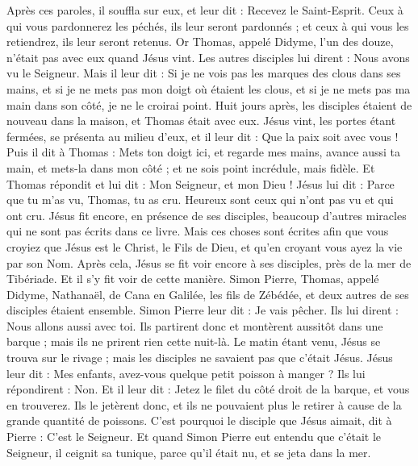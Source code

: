\begin{multicols}{2}
Après ces paroles, il souffla sur eux, et leur dit : Recevez le Saint-Esprit.
Ceux à qui vous pardonnerez les péchés, ils leur seront pardonnés ; et ceux à qui vous les retiendrez, ils leur seront retenus.
Or Thomas, appelé Didyme, l'un des douze, n'était pas avec eux quand Jésus vint.
Les autres disciples lui dirent : Nous avons vu le Seigneur. Mais il leur dit : Si je ne vois pas les marques des clous dans ses mains, et si je ne mets pas mon doigt où étaient les clous, et si je ne mets pas ma main dans son côté, je ne le croirai point.
Huit jours après, les disciples étaient de nouveau dans la maison, et Thomas était avec eux. Jésus vint, les portes étant fermées, se présenta au milieu d'eux, et il leur dit : Que la paix soit avec vous !
Puis il dit à Thomas : Mets ton doigt ici, et regarde mes mains, avance aussi ta main, et mets-la dans mon côté ; et ne sois point incrédule, mais fidèle.
Et Thomas répondit et lui dit : Mon Seigneur, et mon Dieu !
Jésus lui dit : Parce que tu m'as vu, Thomas, tu as cru. Heureux sont ceux qui n'ont pas vu et qui ont cru.
Jésus fit encore, en présence de ses disciples, beaucoup d'autres miracles qui ne sont pas écrits dans ce livre.
Mais ces choses sont écrites afin que vous croyiez que Jésus est le Christ, le Fils de Dieu, et qu'en croyant vous ayez la vie par son Nom.
\VerseOne{}Après cela, Jésus se fit voir encore à ses disciples, près de la mer de Tibériade. Et il s'y fit voir de cette manière.
Simon Pierre, Thomas, appelé Didyme, Nathanaël, de Cana en Galilée, les fils de Zébédée, et deux autres de ses disciples étaient ensemble.
Simon Pierre leur dit : Je vais pêcher. Ils lui dirent : Nous allons aussi avec toi. Ils partirent donc et montèrent aussitôt dans une barque ; mais ils ne prirent rien cette nuit-là.
Le matin étant venu, Jésus se trouva sur le rivage ; mais les disciples ne savaient pas que c'était Jésus.
Jésus leur dit : Mes enfants, avez-vous quelque petit poisson à manger ? Ils lui répondirent : Non.
Et il leur dit : Jetez le filet du côté droit de la barque, et vous en trouverez. Ils le jetèrent donc, et ils ne pouvaient plus le retirer à cause de la grande quantité de poissons.
C'est pourquoi le disciple que Jésus aimait, dit à Pierre : C'est le Seigneur. Et quand Simon Pierre eut entendu que c'était le Seigneur, il ceignit sa tunique, parce qu'il était nu, et se jeta dans la mer.

\end{multicols}
